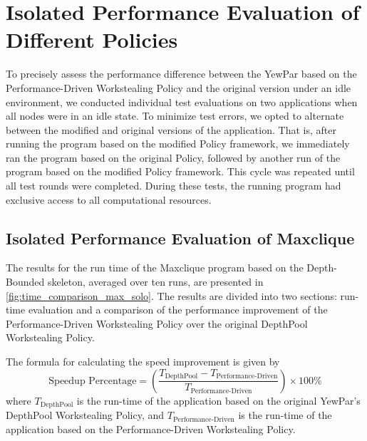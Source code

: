 \documentclass{mproj}
\begin{document}
\section{Isolated Performance Evaluation of Different Policies}

To precisely assess the performance difference between the YewPar based on the Performance-Driven Workstealing Policy and the original version under an idle environment,
we conducted individual test evaluations on two applications when all nodes were in an idle state.
To minimize test errors,
we opted to alternate between the modified and original versions of the application.
That is, after running the program based on the modified Policy framework,
we immediately ran the program based on the original Policy,
followed by another run of the program based on the modified Policy framework.
This cycle was repeated until all test rounds were completed.
During these tests, the running program had exclusive access to all computational resources.

\subsection{Isolated Performance Evaluation of Maxclique}

The results for the run time of the Maxclique program based on the Depth-Bounded skeleton, averaged over ten runs, are presented in \ref{fig:time_comparison_max_solo}.
The results are divided into two sections: run-time evaluation and a comparison of the performance improvement of the Performance-Driven Workstealing Policy over the original DepthPool Workstealing Policy.

The formula for calculating the speed improvement is given by
\begin{equation}
    \text{Speedup Percentage} = \left( \frac{T_{\text{DepthPool}} - T_{\text{Performance-Driven}}}{T_{\text{Performance-Driven}}} \right) \times 100\%
\end{equation}
where \( T_{\text{DepthPool}} \) is the run-time of the application based on the original YewPar's DepthPool Workstealing Policy,
and \( T_{\text{Performance-Driven}} \) is the run-time of the application based on the Performance-Driven Workstealing Policy.
\end{document}
